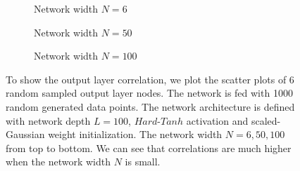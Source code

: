 \begin{figure}
  \centering
  \newcommand{\myWidth}{.95\textwidth}
  \begin{subfigure}{\myWidth}
    \centering
    \caption{Network width $N=6$}
    \label{fig:sec4_sim1_a}
  \end{subfigure}%
  
  \begin{subfigure}{\myWidth}
    \centering
    \caption{Network width $N=50$}
    \label{fig:sec4_sim1_b}
  \end{subfigure}%
  
  \begin{subfigure}{\myWidth}
    \centering
    \caption{Network width $N=100$}
    \label{fig:sec4_sim1_c}
  \end{subfigure}%
  
  \caption[Scatter plots for the $Hard\text{-}Tanh$ activation and the scaled-Gaussian initialization.]
  {To show the output layer correlation, we plot the scatter plots of 6 random sampled output
  layer nodes. The network is fed with 1000 random generated data points.
  The network architecture is defined with network depth $L=100$,
  $Hard\text{-}Tanh$ activation and scaled-Gaussian weight initialization. The network width
  $N=6, 50, 100$ from top to bottom. We can see that correlations are much higher
  when the network width $N$ is small.}
  \label{fig:sec4_sim1}
  \end{figure}



